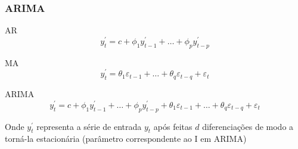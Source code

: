 \documentclass[mathserif,serif]{beamer}
\begin{document}
\begin{frame}
	\frametitle{ARIMA}
		
	\begin{block}{AR}			
		\begin{equation*}
			y^{'}_{t} = c + \phi_{1}y^{'}_{t-1} + \dots + \phi_{p}y^{'}_{t-p}
		\end{equation*}
	\end{block}
	
	\pause	
	
	\begin{block}{MA}
		\begin{equation*}
			y^{'}_{t} = \theta_{1}\varepsilon_{t-1} + \dots + \theta_{q}\varepsilon_{t-q} + \varepsilon_{t}
		\end{equation*}
	\end{block}
	
	\pause	
		
	\begin{block}{ARIMA}
		\begin{equation*}
			y^{'}_{t} = c + \phi_{1}y^{'}_{t-1} + \dots + \phi_{p}y^{'}_{t-p} + \theta_{1}\varepsilon_{t-1} + \dots + \theta_{q}\varepsilon_{t-q} + \varepsilon_{t}
		\end{equation*}
	\end{block}		
	
	Onde $y^{'}_{t}$ representa a série de entrada $y_{t}$ após feitas $d$ diferenciações de modo a torná-la estacionária (parâmetro correspondente ao I em ARIMA)
	
\end{frame}		
\end{document}
